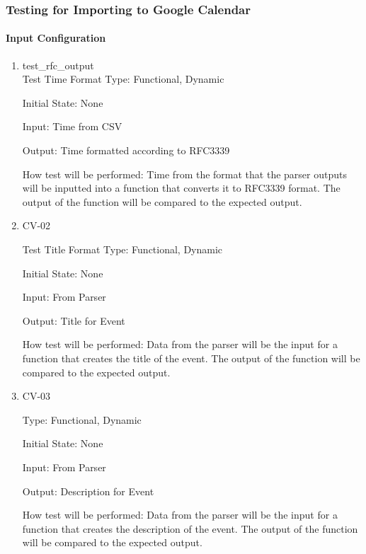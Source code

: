 \documentclass[12pt, titlepage]{article}
\begin{document}
\subsubsection{Testing for Importing to Google Calendar}

\paragraph{Input Configuration}

\begin{enumerate}

\item{\color{blue}test\_rfc\_output}\\
\color{black}
Test Time Format
Type: Functional, Dynamic
					
Initial State: None
					
Input: Time from CSV
					
Output: Time formatted according to RFC3339
					
How test will be performed: 
Time from the format that the parser outputs will be inputted into a function that converts it to RFC3339 format. The output of the function will be compared to the expected output. 

\item{CV-02\\}

Test Title Format
Type: Functional, Dynamic
					
Initial State: None
					
Input: From Parser
					
Output: Title for Event
					
How test will be performed: 
Data from the parser will be the input for a function that creates the title of the event. 
The output of the function will be compared to the expected output.

\item{CV-03\\}

Type: Functional, Dynamic
					
Initial State: None
					
Input: From Parser
					
Output: Description for Event
					
How test will be performed: 
Data from the parser will be the input for a function that creates the description of the event. 
The output of the function will be compared to the expected output.
\end{enumerate}
\end{document}
